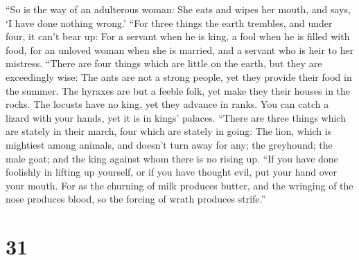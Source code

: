  ``So is the way of an adulterous woman: She eats and
wipes her mouth, and says, `I have done nothing wrong.' 
``For three things the earth trembles, and under four, it can't bear up:
 For a servant when he is king, a fool when he is filled
with food,  for an unloved woman when she is married, and
a servant who is heir to her mistress.  ``There are four
things which are little on the earth, but they are exceedingly wise:
 The ants are not a strong people, yet they provide their
food in the summer.  The hyraxes are but a feeble folk,
yet make they their houses in the rocks.  The locusts
have no king, yet they advance in ranks.  You can catch a
lizard with your hands, yet it is in kings' palaces. 
``There are three things which are stately in their march, four which
are stately in going:  The lion, which is mightiest among
animals, and doesn't turn away for any;  the greyhound;
the male goat; and the king against whom there is no rising up.
 ``If you have done foolishly in lifting up yourself, or
if you have thought evil, put your hand over your mouth. 
For as the churning of milk produces butter, and the wringing of the
nose produces blood, so the forcing of wrath produces strife.''

\hypertarget{section-26}{%
\section{31}\label{section-26}}

